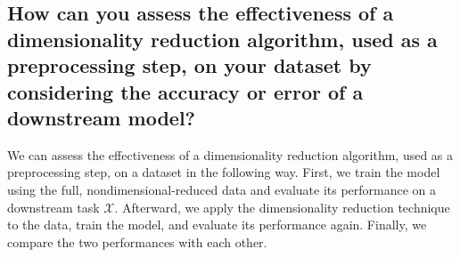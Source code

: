 \documentclass{article}
\begin{document}
\subsection{How can you assess the effectiveness of a dimensionality reduction algorithm, used as a preprocessing step, on your dataset by considering the accuracy or error of a downstream model?}

We can assess the effectiveness of a dimensionality reduction algorithm, used as a preprocessing step, on a dataset in the following way. First, we train the model using the full, nondimensional-reduced data and evaluate its performance on a downstream task $\mathcal{X}$. Afterward, we apply the dimensionality reduction technique to the data, train the model, and evaluate its performance again. Finally, we compare the two performances with each other.

\clearpage

% 
% 

\end{document}
